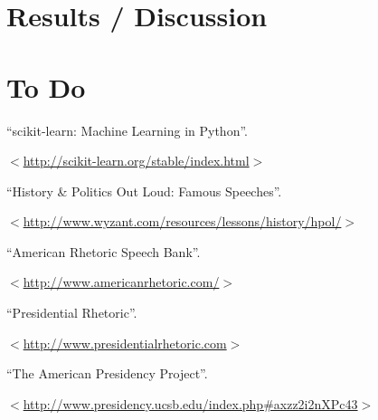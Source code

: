 \documentclass[twocolumn]{article}
\begin{document}
\section{Results / Discussion}

\section{To Do}

\begin{thebibliography}{9}

  ``scikit-learn: Machine Learning in Python''.
  
  $<$\url{http://scikit-learn.org/stable/index.html}$>$

  ``History \& Politics Out Loud: Famous Speeches''.
  
  $<$\url{http://www.wyzant.com/resources/lessons/history/hpol/}$>$
  
  ``American Rhetoric Speech Bank''.
  
  $<$\url{http://www.americanrhetoric.com/}$>$

  ``Presidential Rhetoric''.
  
  $<$\url{http://www.presidentialrhetoric.com}$>$

  ``The American Presidency Project''.
  
  $<$\url{http://www.presidency.ucsb.edu/index.php#axzz2i2nXPc43}$>$


\end{thebibliography}
\end{document}

